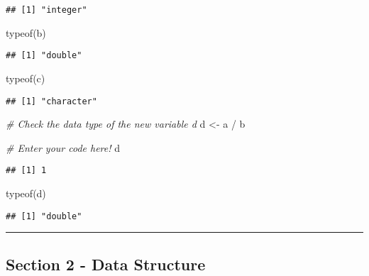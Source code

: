 \documentclass[
]{article}
\newenvironment{Shaded}{\begin{snugshade}}{\end{snugshade}}
\newcommand{\CommentTok}[1]{\textcolor[rgb]{0.56,0.35,0.01}{\textit{#1}}}
\newcommand{\FunctionTok}[1]{\textcolor[rgb]{0.00,0.00,0.00}{#1}}
\newcommand{\NormalTok}[1]{#1}
\newcommand{\OtherTok}[1]{\textcolor[rgb]{0.56,0.35,0.01}{#1}}
\newcommand{\SpecialCharTok}[1]{\textcolor[rgb]{0.00,0.00,0.00}{#1}}
\begin{document}
\begin{verbatim}
## [1] "integer"
\end{verbatim}

\begin{Shaded}
\begin{Highlighting}[]
\FunctionTok{typeof}\NormalTok{(b)}
\end{Highlighting}
\end{Shaded}

\begin{verbatim}
## [1] "double"
\end{verbatim}

\begin{Shaded}
\begin{Highlighting}[]
\FunctionTok{typeof}\NormalTok{(c)}
\end{Highlighting}
\end{Shaded}

\begin{verbatim}
## [1] "character"
\end{verbatim}

\begin{Shaded}
\begin{Highlighting}[]
\CommentTok{\# Check the data type of the new variable \textquotesingle{}d\textquotesingle{}}
\NormalTok{d }\OtherTok{\textless{}{-}}\NormalTok{ a }\SpecialCharTok{/}\NormalTok{ b}

\CommentTok{\# Enter your code here!}
\NormalTok{d}
\end{Highlighting}
\end{Shaded}

\begin{verbatim}
## [1] 1
\end{verbatim}

\begin{Shaded}
\begin{Highlighting}[]
\FunctionTok{typeof}\NormalTok{(d)}
\end{Highlighting}
\end{Shaded}

\begin{verbatim}
## [1] "double"
\end{verbatim}

\begin{center}\rule{0.5\linewidth}{0.5pt}\end{center}

\hypertarget{section-2---data-structure}{%
\subsection{Section 2 - Data
Structure}\label{section-2---data-structure}}
\end{document}
